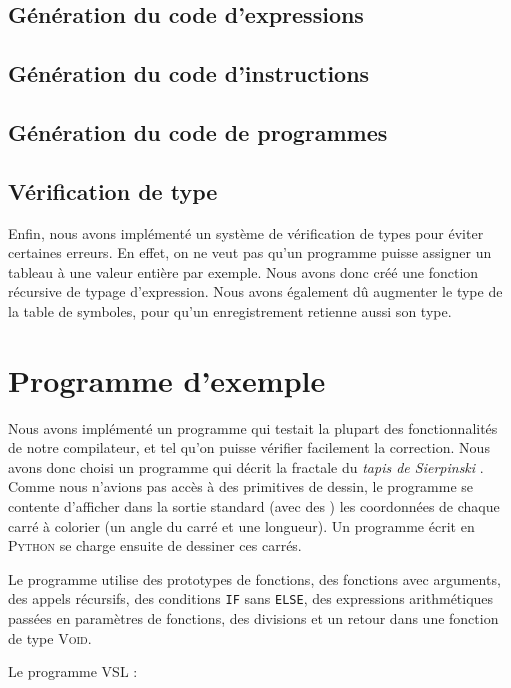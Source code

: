 \documentclass[french]{article}
\begin{document}
  \subsection{Génération du code d'expressions}
  \subsection{Génération du code d'instructions}

  \subsection{Génération du code de programmes}
  \subsection{Vérification de type}
  Enfin, nous avons implémenté un système de vérification de types pour éviter certaines erreurs. En effet, on ne veut pas qu'un programme puisse assigner un tableau à une valeur entière par exemple. Nous avons donc créé une fonction récursive de typage d'expression. Nous avons également dû augmenter le type de la table de symboles, pour qu'un enregistrement retienne aussi son type.

  
\section{Programme d'exemple}
Nous avons implémenté un programme qui testait la plupart des fonctionnalités de notre compilateur, et tel qu'on puisse vérifier facilement la correction. Nous avons donc choisi un programme qui décrit la fractale du \textit{tapis de Sierpinski} . Comme nous n'avions pas accès à des primitives de dessin, le programme se contente d'afficher dans la sortie standard (avec des \iprint) les coordonnées de chaque carré à colorier (un angle du carré et une longueur). Un programme écrit en \textsc{Python} se charge ensuite de dessiner ces carrés.

Le programme utilise des prototypes de fonctions, des fonctions avec arguments, des appels récursifs, des conditions \texttt{IF} sans \texttt{ELSE}, des expressions arithmétiques passées en paramètres de fonctions, des divisions et un retour dans une fonction de type \textsc{Void}.

Le programme \textsc{VSL} :

\end{document}
